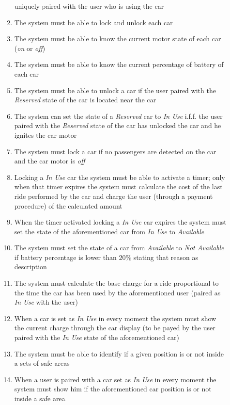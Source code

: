 \begin{description}
\begin{enumerate}[resume*]
 	  			uniquely paired with the user who is using the car
  				\item The system must be able to lock and unlock each car
  				\item The system must be able to know the current motor state of each car
  				(\emph{on} or \emph{off})
  				\item The system must be able to know the current percentage of battery of each car
  				\item The system must be able to unlock a car if the user paired with the
  				\emph{Reserved} state of the car is located near  the car
  				\item The system can set the state of a \emph{Reserved} car to \emph{In Use} i.f.f.
  				the user paired with the \emph{Reserved} state of the car has unlocked the car and he
  				ignites the car motor
  				\item The system must lock a car if no passengers are detected on the car and the car
  				motor is \emph{off}
  				\item Locking  a \emph{In Use} car the system must be able to activate a timer; only
  				when that timer expires the system must calculate the cost of the last ride performed
  				by the car and charge the user (through a payment procedure) of the calculated
  				amount
  				\item When the timer activated locking a \emph{In Use} car expires the system must
  				set the state of the aforementioned car from \emph{In Use} to \emph{Available}
  				\item The system must set the state of a car from \emph{Available}
  				to \emph{Not Available} if battery percentage is lower than 20\%  stating that reason
  				as description
  				\item The system must calculate the base charge for a ride proportional to the time
  				the car has been used by the aforementioned user (paired as \emph{In Use} with the
  				user)
  				\item When a car is set as \emph{In Use} in every moment the
  				system must show the current charge through the car display (to be payed by the user
  				paired with the \emph{In Use} state of the aforementioned car) 
  				\item The system must be able to identify if a given position is or not inside a sets of
  				safe areas
  				\item When a user is paired with a car set as \emph{In Use} in every moment the
  				system must show him if the aforementioned car position is or not inside a safe area

\end{enumerate}
\end{description}
